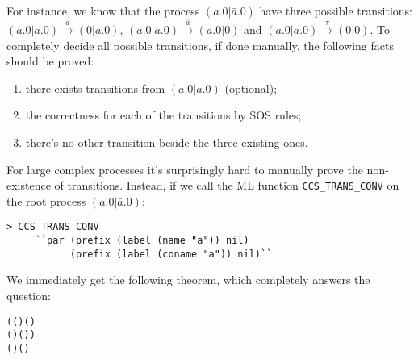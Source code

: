 For instance, we know that the process $(a.0 | \bar{a}.0)$ have three
possible transitions: $(a.0 | \bar{a}.0) \overset{a}{\longrightarrow}
(0 | \bar{a}.0)$, $(a.0 | \bar{a}.0)
\overset{\bar{a}}{\longrightarrow} (a.0 | 0)$ and $(a.0 | \bar{a}.0)
\overset{\tau}{\longrightarrow} (0 | 0)$.
To completely decide all possible transitions, if done manually, the
following facts should be proved:
\begin{enumerate}
\item there exists transitions from $(a.0 | \bar{a}.0)$ (optional);
\item the correctness for each of the transitions by SOS rules;
\item there's no other transition beside the three existing ones.
\end{enumerate}
For large complex processes it's surprisingly hard to manually prove the
non-existence of transitions. Instead, if we call the ML function \texttt{CCS\_TRANS\_CONV} on the
root process $(a.0 | \bar{a}.0)$:
\begin{lstlisting}
> CCS_TRANS_CONV
	 ``par (prefix (label (name "a")) nil)
	       (prefix (label (coname "a")) nil)``
\end{lstlisting}
We immediately get the following theorem, which completely answers the question:
\begin{alltt}
\HOLTokenTurnstile{}   \HOLSymConst{\ensuremath{\parallel}}   \HOLTokenTransBegin{}\HOLTokenTransEnd {} \HOLSymConst{\HOLTokenEquiv{}}
   (( \HOLSymConst{=}  ) \HOLSymConst{\HOLTokenConj{}} ( \HOLSymConst{=}  \HOLSymConst{\ensuremath{\parallel}}  ) \HOLSymConst{\HOLTokenDisj{}}
    ( \HOLSymConst{=}  ) \HOLSymConst{\HOLTokenConj{}} ( \HOLSymConst{=}   \HOLSymConst{\ensuremath{\parallel}} )) \HOLSymConst{\HOLTokenDisj{}}
   ( \HOLSymConst{=} \HOLSymConst{\ensuremath{\tau}}) \HOLSymConst{\HOLTokenConj{}} ( \HOLSymConst{=}  \HOLSymConst{\ensuremath{\parallel}} )
\end{alltt}
